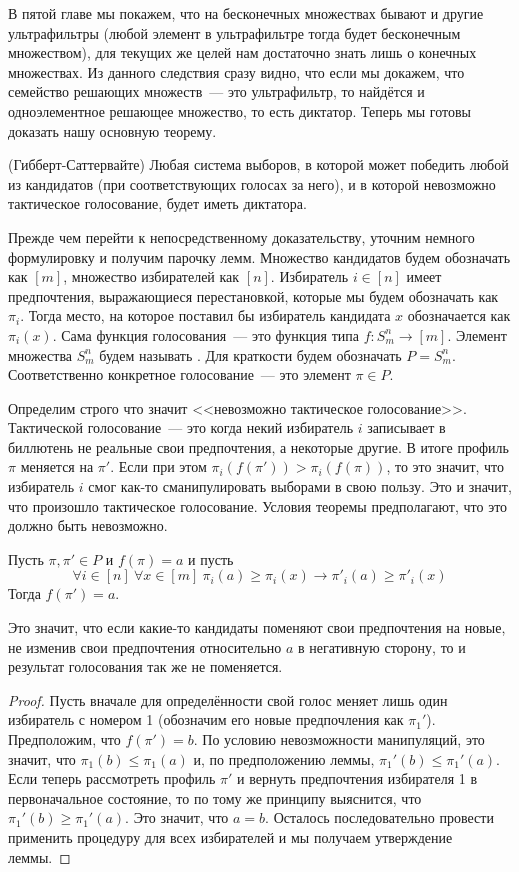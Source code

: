В пятой главе мы покажем, что на бесконечных множествах бывают и другие ультрафильтры (любой элемент в ультрафильтре тогда будет бесконечным множеством), для текущих же целей нам достаточно знать лишь о конечных множествах. Из данного следствия сразу видно, что если мы докажем, что семейство решающих множеств~--- это ультрафильтр, то найдётся и одноэлементное решающее множество, то есть диктатор. Теперь мы готовы доказать нашу основную теорему.

\begin{thm}
(Гибберт-Саттервайте) Любая система выборов, в которой может победить любой из кандидатов (при соответствующих голосах за него), и в которой невозможно тактическое голосование, будет иметь диктатора.
\end{thm}

Прежде чем перейти к непосредственному доказательству, уточним немного формулировку и получим парочку лемм. Множество кандидатов будем обозначать как $[m]$, множество избирателей как $[n]$. Избиратель $i\in [n]$ имеет предпочтения, выражающиеся перестановкой, которые мы будем обозначать как $\pi_i$. Тогда место, на которое поставил бы избиратель кандидата $x$ обозначается как $\pi_i(x)$. Сама функция голосования~--- это функция типа $f:S_m^n\to [m]$. Элемент множества $S_m^n$ будем называть . Для краткости будем обозначать $P = S_m^n$. Соответственно конкретное голосование~--- это элемент $\pi\in P$.

Определим строго что значит <<невозможно тактическое голосование>>. Тактической голосование~--- это когда некий избиратель $i$ записывает в биллютень не реальные свои предпочтения, а некоторые другие. В итоге профиль $\pi$ меняется на $\pi'$. Если при этом $\pi_i(f(\pi')) > \pi_i(f(\pi))$, то это значит, что избиратель $i$ смог как-то сманипулировать выборами в свою пользу. Это и значит, что произошло тактическое голосование. Условия теоремы предполагают, что это должно быть невозможно.

\begin{lemma}
Пусть $\pi, \pi'\in P$ и $f(\pi) = a$ и пусть
$$\forall i\in [n]\ \forall x\in[m]\ \pi_i(a)\ge\pi_i(x)\to\pi'_i(a)\ge\pi'_i(x)$$
Тогда $f(\pi') = a$.
\end{lemma}

Это значит, что если какие-то кандидаты поменяют свои предпочтения на новые, не изменив свои предпочтения относительно $a$ в негативную сторону, то и результат голосования так же не поменяется.

\begin{proof}
Пусть вначале для определённости свой голос меняет лишь один избиратель с номером 1 (обозначим его новые предпочления как $\pi_1'$). Предположим, что $f(\pi') = b$. По условию невозможности манипуляций, это значит, что $\pi_1(b)\le\pi_1(a)$ и, по предположению леммы, $\pi_1'(b)\le\pi_1'(a)$. Если теперь рассмотреть профиль $\pi'$ и вернуть предпочтения избирателя 1 в первоначальное состояние, то по тому же принципу выяснится, что $\pi_1'(b)\ge\pi_1'(a)$. Это значит, что $a=b$. Осталось последовательно провести применить процедуру для всех избирателей и мы получаем утверждение леммы.
\end{proof}

